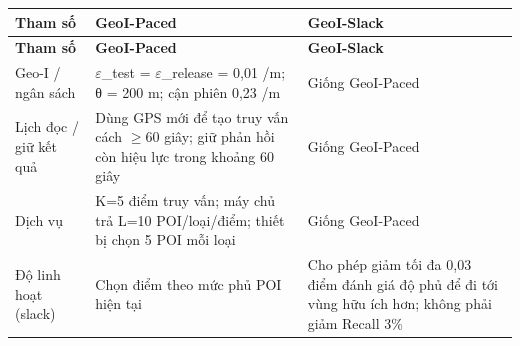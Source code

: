 \begingroup\small
\begin{longtable}{@{}P{3.938cm}P{6.350cm}P{6.350cm}@{}}
\toprule
\textbf{Tham số} & \textbf{GeoI-Paced} & \textbf{GeoI-Slack}\\\midrule
\endfirsthead
\toprule
\textbf{Tham số} & \textbf{GeoI-Paced} & \textbf{GeoI-Slack}\\\midrule
\endhead
\bottomrule\endfoot
Geo-I / ngân sách & $\varepsilon$\_\allowbreak{}test = $\varepsilon$\_\allowbreak{}release = 0,01 /m; θ = 200 m; cận phiên 0,23 /m & Giống GeoI-Paced\\
\addlinespace[3pt]
Lịch đọc / giữ kết quả & Dùng GPS mới để tạo truy vấn cách $\ge$60 giây; giữ phản hồi còn hiệu lực trong khoảng 60 giây & Giống GeoI-Paced\\
\addlinespace[3pt]
Dịch vụ & K=5 điểm truy vấn; máy chủ trả L=10 POI/loại/điểm; thiết bị chọn 5 POI mỗi loại & Giống GeoI-Paced\\
\addlinespace[3pt]
Độ linh hoạt (slack) & Chọn điểm theo mức phủ POI hiện tại & Cho phép giảm tối đa 0,03 điểm đánh giá độ phủ để đi tới vùng hữu ích hơn; không phải giảm Recall 3\%\\
\end{longtable}
\endgroup
{}

